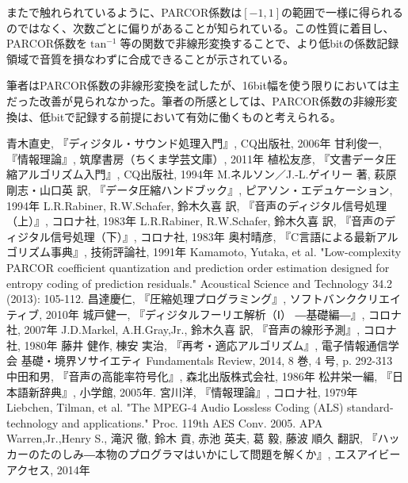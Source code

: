 \documentclass[uplatex,dvipdfmx,b5j,10pt]{jsbook}
\theoremstyle{definition}
\begin{document}
また\cite{parcorcoefopt, soundhigheffcomp}で触れられているように、PARCOR係数は$[-1,1]$の範囲で一様に得られるのではなく、次数ごとに偏りがあることが知られている。この性質に着目し、PARCOR係数を$\tan^{-1}$等の関数で非線形変換することで、より低bitの係数記録領域で音質を損なわずに合成できることが示されている。

筆者はPARCOR係数の非線形変換を試したが、16bit幅を使う限りにおいては主だった改善が見られなかった。筆者の所感としては、PARCOR係数の非線形変換は、低bitで記録する前提において有効に働くものと考えられる。

\begin{thebibliography}{99}
 青木直史, 『ディジタル・サウンド処理入門』, CQ出版社, 2006年
 甘利俊一, 『情報理論』, 筑摩書房（ちくま学芸文庫）, 2011年
 植松友彦, 『文書データ圧縮アルゴリズム入門』, CQ出版社, 1994年
 M.ネルソン／J.-L.ゲイリー 著, 萩原剛志・山口英 訳, 『データ圧縮ハンドブック』,  ピアソン・エデュケーション, 1994年
 L.R.Rabiner, R.W.Schafer, 鈴木久喜 訳, 『音声のディジタル信号処理（上）』, コロナ社, 1983年
 L.R.Rabiner, R.W.Schafer, 鈴木久喜 訳, 『音声のディジタル信号処理（下）』, コロナ社, 1983年
 奥村晴彦, 『C言語による最新アルゴリズム事典』, 技術評論社, 1991年
 Kamamoto, Yutaka, et al. "Low-complexity PARCOR coefficient quantization and prediction order estimation designed for entropy coding of prediction residuals." Acoustical Science and Technology 34.2 (2013): 105-112.
 昌達慶仁, 『圧縮処理プログラミング』, ソフトバンククリエイティブ, 2010年
 城戸健一, 『ディジタルフーリエ解析（Ⅰ） ―基礎編―』, コロナ社, 2007年
 J.D.Markel, A.H.Gray,Jr., 鈴木久喜 訳, 『音声の線形予測』, コロナ社, 1980年
 藤井 健作, 棟安 実治, 『再考・適応アルゴリズム』, 電子情報通信学会 基礎・境界ソサイエティ Fundamentals Review, 2014, 8 巻, 4 号, p. 292-313
 中田和男, 『音声の高能率符号化』, 森北出版株式会社, 1986年
 松井栄一編, 『日本語新辞典』, 小学館, 2005年.
 宮川洋, 『情報理論』, コロナ社, 1979年
 Liebchen, Tilman, et al. "The MPEG-4 Audio Lossless Coding (ALS) standard-technology and applications." Proc. 119th AES Conv. 2005.
APA	
 Warren,Jr.,Henry S., 滝沢 徹, 鈴木 貢, 赤池 英夫, 葛 毅, 藤波 順久 翻訳, 『ハッカーのたのしみ―本物のプログラマはいかにして問題を解くか』, エスアイビーアクセス, 2014年

\end{thebibliography}
\end{document}
